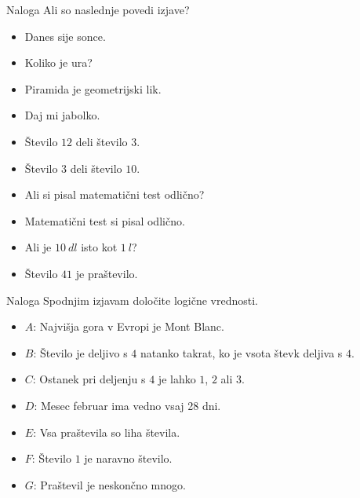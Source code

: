         \begin{frame}
            \begin{exampleblock}{Naloga}
                Ali so naslednje povedi izjave?
                \begin{itemize}   
                    \item Danes sije sonce.
                    \item Koliko je ura?
                    \item Piramida je geometrijski lik.
                    \item Daj mi jabolko.
                    \item Število $12$ deli število $3$.
                    \item Število $3$ deli število $10$.
                    \item Ali si pisal matematični test odlično?
                    \item Matematični test si pisal odlično.
                    \item Ali je $10~dl$ isto kot $1~l$?
                    \item Število $41$ je praštevilo.
                \end{itemize}
            \end{exampleblock}
        \end{frame}

        \begin{frame}
            \begin{exampleblock}{Naloga}
                Spodnjim izjavam določite logične vrednosti.
                \begin{itemize}   
                    \item $A$: Najvišja gora v Evropi je Mont Blanc.
                    \item $B$: Število je deljivo s $4$ natanko takrat, ko je vsota števk deljiva s $4$.
                    \item $C$: Ostanek pri deljenju s $4$ je lahko $1$, $2$ ali $3$.
                    \item $D$: Mesec februar ima vedno vsaj 28 dni.
                    \item $E$: Vsa praštevila so liha števila.
                    \item $F$: Število $1$ je naravno število.
                    \item $G$: Praštevil je neskončno mnogo.
                \end{itemize}
            \end{exampleblock}
            
        \end{frame}

